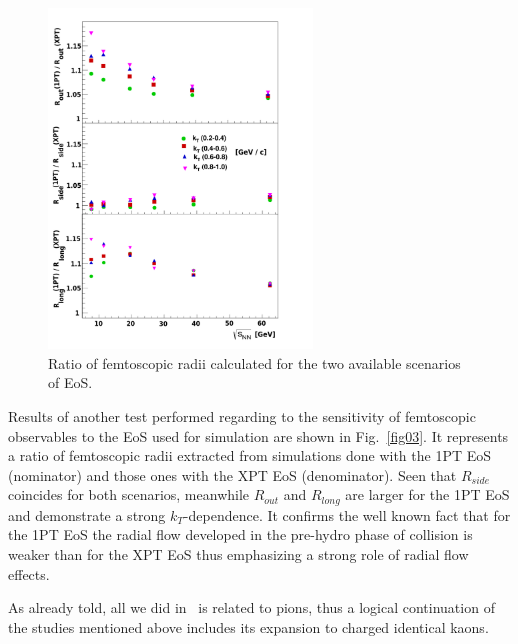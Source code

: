 \documentclass[a4paper]{panl}
\begin{document}
  \begin{figure}[t]
    \begin{center}
      \includegraphics[width=70mm]{fig3.png}
      \vspace{-3mm}
      \caption{Ratio of femtoscopic radii calculated for the two available scenarios of EoS.}
    \end{center}
    \vspace{-5mm}
  \end{figure}
  
  
  Results of another test performed regarding to the sensitivity of femtoscopic observables to the EoS used for simulation are shown in Fig.~\ref{fig03}.
  It represents a ratio of femtoscopic radii extracted from simulations done with the 1PT EoS (nominator) and those ones with the XPT EoS (denominator).
  Seen that $R_{side}$ coincides for both scenarios, meanwhile $R_{out}$ and $R_{long}$ are larger for the 1PT EoS and demonstrate a strong $k_{T}$-dependence.
  It confirms the well known fact that for the 1PT EoS the radial flow developed in the pre-hydro phase of collision is weaker than for the XPT EoS thus emphasizing a strong role
  of radial flow effects.
    
  As already told, all we did in~\cite{Batyuk:2017smw} is related to pions, thus a logical continuation of the studies mentioned above includes its expansion to charged identical kaons.
  
\end{document}
